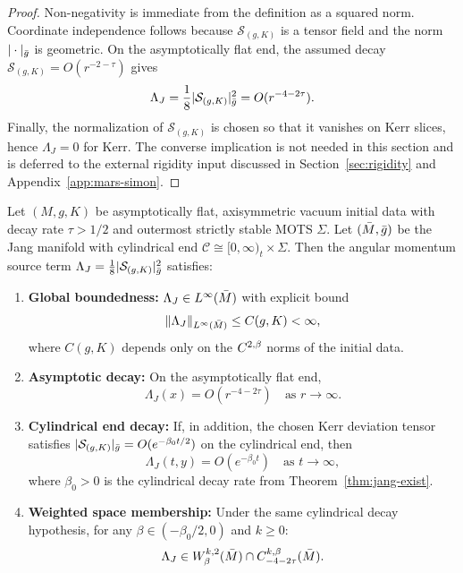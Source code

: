 \begin{proof}[Proof]
Non-negativity is immediate from the definition as a squared norm. Coordinate independence follows because $\mathcal{S}_{(g,K)}$ is a tensor field and the norm $|\cdot|_{\bar{g}}$ is geometric. On the asymptotically flat end, the assumed decay $\mathcal{S}_{(g,K)} = O(r^{-2-\tau})$ gives
\[
\Lambda_J = \frac18 |\mathcal{S}_{(g,K)}|_{\bar{g}}^2 = O(r^{-4-2\tau}).
\]
Finally, the normalization of $\mathcal{S}_{(g,K)}$ is chosen so that it vanishes on Kerr slices, hence $\Lambda_J=0$ for Kerr. The converse implication is not needed in this section and is deferred to the external rigidity input discussed in Section~\ref{sec:rigidity} and Appendix~\ref{app:mars-simon}.
\end{proof}
\begin{lemma}\label{lem:Lambda-J-regularity}
Let $(M, g, K)$ be asymptotically flat, axisymmetric vacuum initial data with decay rate $\tau > 1/2$ and outermost strictly stable MOTS $\Sigma$. Let $(\bar{M}, \bar{g})$ be the Jang manifold with cylindrical end $\mathcal{C} \cong [0,\infty)_t \times \Sigma$. Then the angular momentum source term $\Lambda_J = \frac{1}{8}|\mathcal{S}_{(g,K)}|^2_{\bar{g}}$ satisfies:
\begin{enumerate}[label=\textup{(\roman*)}]
    \item \textbf{Global boundedness:} $\Lambda_J \in L^\infty(\bar{M})$ with explicit bound
    \[
    \|\Lambda_J\|_{L^\infty(\bar{M})} \leq C(g, K) < \infty,
    \]
    where $C(g, K)$ depends only on the $C^{2,\beta}$ norms of the initial data.
    
    \item \textbf{Asymptotic decay:} On the asymptotically flat end,
    \[
    \Lambda_J(x) = O(r^{-4-2\tau}) \quad \text{as } r \to \infty.
    \]

    \item \textbf{Cylindrical end decay:} If, in addition, the chosen Kerr deviation tensor satisfies $|\mathcal{S}_{(g,K)}|_{\bar{g}}=O(e^{-\beta_0 t/2})$ on the cylindrical end, then
    \[
    \Lambda_J(t, y) = O(e^{-\beta_0 t}) \quad \text{as } t \to \infty,
    \]
    where $\beta_0 > 0$ is the cylindrical decay rate from Theorem~\ref{thm:jang-exist}.

    \item \textbf{Weighted space membership:} Under the same cylindrical decay hypothesis, for any $\beta \in (-\beta_0/2, 0)$ and $k \geq 0$:
    \[
    \Lambda_J \in W^{k,2}_\beta(\bar{M}) \cap C^{k,\beta}_{-4-2\tau}(\bar{M}).
    \]
\end{enumerate}
\end{lemma}

